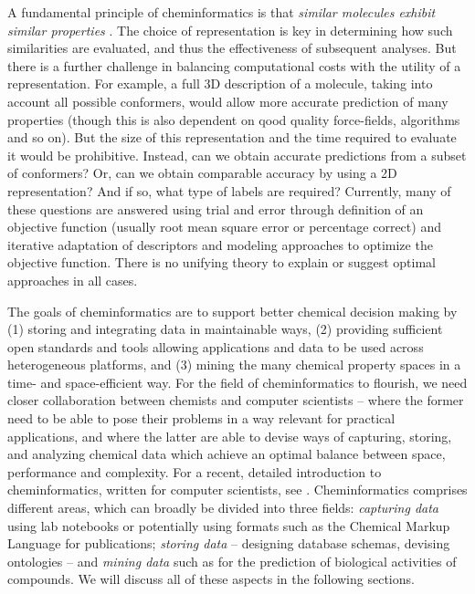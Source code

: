 \documentclass{sig-alternate}
\begin{document}
A fundamental principle of cheminformatics is that \emph{similar
  molecules exhibit similar properties} \cite{Johnson:1990qf}. The
choice of representation is key in determining how such similarities
are evaluated, and thus the effectiveness of subsequent analyses. But
there is a further challenge in balancing computational costs with the
utility of a representation. For example, a full 3D description of a
molecule, taking into account all possible conformers, would allow
more accurate prediction of many properties (though this is also dependent
on qood quality force-fields, algorithms and so on). But the size of this
representation and the time required to evaluate it would be
prohibitive. Instead, can we obtain accurate predictions from a subset
of conformers? Or, can we obtain comparable accuracy by using a 2D
representation? And if so, what type of labels are required?
Currently, many of these questions are answered using trial and error
through definition of an objective function (usually root mean square
error or percentage correct) and iterative adaptation of descriptors
and modeling approaches to optimize the objective function. There is
no unifying theory to explain or suggest optimal approaches in all
cases.

The goals of cheminformatics are to support better chemical
decision making by (1) storing and integrating data in maintainable
ways, (2) providing sufficient open standards and tools allowing
applications and data to be used across heterogeneous platforms, and
(3) mining the many chemical property spaces in a time- and
space-efficient way. For the field of cheminformatics
to flourish, we need closer
collaboration between chemists
and computer scientists -- where the former need to be able to pose
their problems in a way relevant for practical applications, and where
the latter are able to devise ways of capturing, storing, and
analyzing chemical data which achieve an optimal balance between space,
performance and complexity. For a recent,
detailed introduction to cheminformatics, written for computer
scientists, see \cite{brown2009}.
Cheminformatics comprises different areas, which can broadly
be divided into three fields: \emph{capturing data} using lab
notebooks or potentially using formats such as the Chemical Markup
Language for publications; \emph{storing data} -- designing database
schemas, devising ontologies -- and \emph{mining data} such as for the
prediction of biological activities of compounds.
We will discuss all of these aspects in the following
sections.
\end{document}
